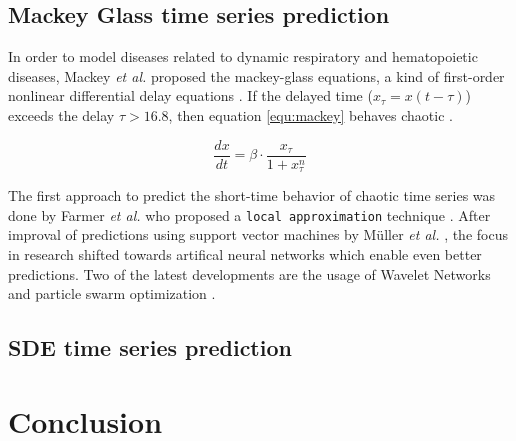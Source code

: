 \documentclass{article}
\begin{document}
\subsection{Mackey Glass time series prediction}

In order to model diseases related to dynamic respiratory and hematopoietic 
diseases, Mackey \textit{et al.} proposed the mackey-glass equations, a kind of 
first-order nonlinear differential delay equations \cite{mackey1977}. If the 
delayed time ($x_{\tau} = x(t - \tau)$) exceeds the delay $\tau > 16.8$, then 
equation \ref{equ:mackey} behaves chaotic \cite{farmer1982}.

\begin{equation}
  \frac{dx}{dt} = \beta \cdot \frac{x_{\tau}}{1 + x_{\tau}^n}
  \label{equ:mackey}
\end{equation}

The first approach to predict the short-time behavior of chaotic time series
was done by Farmer \textit{et al.} who proposed a \texttt{local approximation}
technique \cite{farmer1987}. After improval of predictions using support vector
machines by Müller \textit{et al.} \cite{muller1997}, the focus in research
shifted towards artifical neural networks which enable even better predictions.
Two of the latest developments are the usage of Wavelet Networks
\cite{alexandridis2013} and particle swarm optimization \cite{caraballo2016}.


\subsection{SDE time series prediction}
    
\section{Conclusion}



\end{document}
